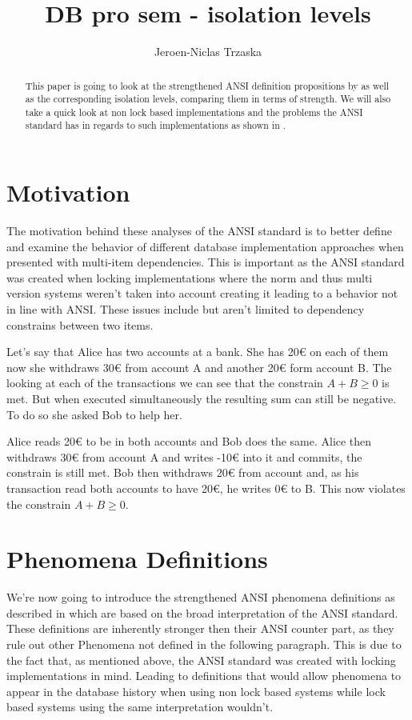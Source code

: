 \documentclass[sigconf, review=true]{acmart}
\author{Jeroen-Niclas Trzaska}
\title{DB pro sem - isolation levels}
\affiliation{%
   \institution{TU Dresden}
   \city{Dresden}
   \state{Saxony}
   \country{Germany}}
\begin{document}
\begin{abstract}

    This paper is going to look at the strengthened ANSI definition propositions by \cite{Adya_Liskov_O_Neil_2000} as well as the corresponding isolation levels,
    comparing them in terms of strength. We will also take a quick look at non lock based implementations
    and the problems the ANSI standard has in regards to such implementations as shown in \cite{Berenson_Bernstein_Gray_Melton_O_Neil_O_Neil_1995}.
\end{abstract}
\maketitle

\section{Motivation}
The motivation behind these analyses of the ANSI standard is to better define and examine the
behavior of different database implementation approaches when presented with multi-item dependencies.
This is important as the ANSI standard was created when locking implementations where the norm and thus multi version systems weren't
taken into account creating it leading to a behavior not in line with ANSI.
These issues include but aren't limited to dependency constrains between two items.

Let's say that Alice has two accounts at a bank. She has 20€ on each of them now she withdraws 30€ from account A and another 20€ form account B.
The looking at each of the transactions we can see that the constrain $A+B \geq 0$ is met.
But when executed simultaneously the resulting sum can still be negative. To do so
she asked Bob to help her.
\begin{example}
    Alice reads 20€ to be in both accounts and Bob does the same. Alice then withdraws 30€ from account A and writes -10€ into it and commits, the constrain is still met.
    Bob then withdraws 20€ from account and, as his transaction read both accounts to have 20€, he writes 0€  to B. This now violates the constrain $A+B \geq 0$.
\end{example}
\section{Phenomena Definitions}
We're now going to introduce the strengthened ANSI phenomena definitions as described in \cite{Adya_Liskov_O_Neil_2000}  which
are based on the broad interpretation of the ANSI standard. These definitions are inherently stronger then their ANSI counter part,
as they rule out other Phenomena not defined in the following paragraph. This is due to the fact that, as mentioned above, the ANSI standard
was created with locking implementations in mind. Leading to definitions that would allow phenomena to appear in the database history when using non lock based systems
while lock based systems using the same interpretation wouldn't.
\end{document}
